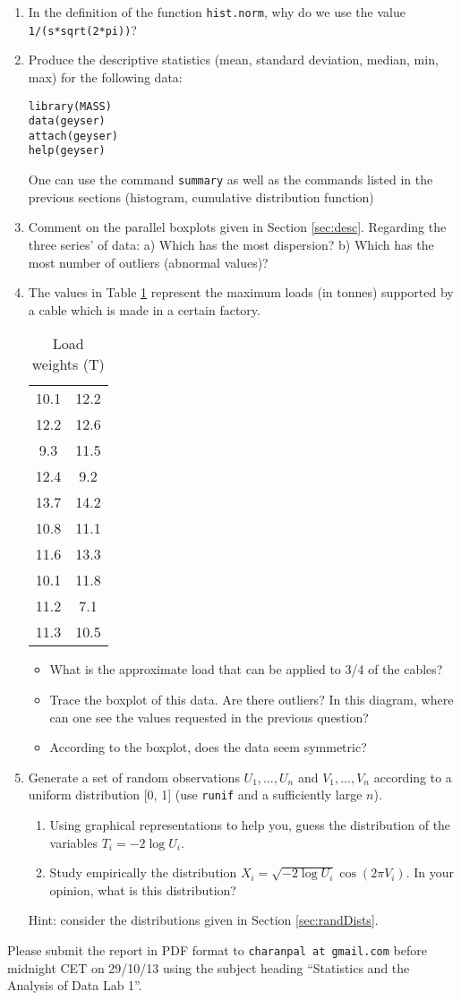 \documentclass[a4paper,10pt]{article}
\begin{document}
\begin{enumerate} 
\item In the definition of the function \texttt{hist.norm}, why do we use the value \texttt{1/(s*sqrt(2*pi))}?
\item Produce the descriptive statistics (mean, standard deviation, median, min, max) for the following data: 
\begin{lstlisting} 
library(MASS)
data(geyser)
attach(geyser)
help(geyser)
\end{lstlisting}
One can use the command \texttt{summary} as well as the commands listed in the previous sections (histogram, cumulative distribution function) 
\item Comment on the parallel boxplots given in Section  \ref{sec:desc}. Regarding the three series' of data: a) Which has the most dispersion? b) Which has the most number of outliers (abnormal values)? 
\item The values in Table \ref{tab:loads} represent the maximum loads (in tonnes) supported by a cable which is made in a certain factory. 
\begin{table}[ht]
\begin{center}
\begin{tabular}{c c} 
\hline
10.1 & 12.2\\
12.2 & 12.6\\
9.3 & 11.5\\
12.4 & 9.2\\
13.7 & 14.2\\
10.8 & 11.1\\
11.6 & 13.3\\
10.1 & 11.8 \\
11.2 & 7.1\\
11.3 & 10.5\\
\hline
\end{tabular}
\end{center}
\caption{Load weights (T)}\label{tab:loads}
\end{table}
\begin{itemize}
\item What is the approximate load that can be applied to 3/4 of the cables? 
\item Trace the boxplot of this data. Are there outliers? In this diagram, where can one see the values requested in the previous question? 
\item According to the boxplot, does the data seem symmetric? 
\end{itemize}
\item Generate a set of random observations $U_1 , \ldots , U_n$ and $V_1 ,\ldots , V_n$ according to a uniform distribution [0, 1] (use \texttt{runif} and a sufficiently large $n$). 
\begin{enumerate}
\item Using graphical representations to help you, guess the distribution of the variables $T_i = -2 \log U_i$. 
\item Study empirically the distribution $X_i = \sqrt{-2 \log U_i} \cos(2 \pi V_i ).$ In your opinion, what is this distribution? 
\end{enumerate}
Hint: consider the distributions given in Section \ref{sec:randDists}. 
\end{enumerate}

Please submit the report in PDF format to \texttt{charanpal at gmail.com} before midnight CET on 29/10/13 using the subject heading ``Statistics and the Analysis of Data Lab 1''. 
\end{document}
